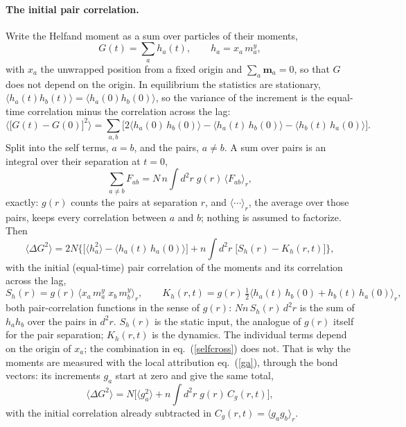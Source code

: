 \documentclass[11pt,aps,preprint,nofootinbib,superscriptaddress,tightenlines]{revtex4-2}
\def\st{\begin{equation}}
\def\stp{\end{equation}}
\def\Eq#1{eq.~(\ref{#1})}
\newcommand{\avg}[1]{\langle #1\rangle}
\let\oldparagraph\paragraph
\renewcommand{\paragraph}{\par\bigskip\oldparagraph}
\begin{document}
\paragraph{The initial pair correlation.}  Write the Helfand moment as a sum over particles of their moments,
\st
G(t)=\sum_ah_a(t),\qquad h_a=x_a\,m_a^y ,
\stp
with $x_a$ the unwrapped position from a fixed origin and $\sum_a\bm m_a=0$, so that $G$ does not depend on the origin.  In equilibrium the
statistics are stationary, $\avg{h_a(t)h_b(t)}=\avg{h_a(0)h_b(0)}$, so the variance of the increment is the equal-time correlation minus the
correlation across the lag:
\st
\avg{\big[G(t)-G(0)\big]^2}=\sum_{a,b}\Big[2\avg{h_a(0)\,h_b(0)}-\avg{h_a(t)\,h_b(0)}-\avg{h_b(t)\,h_a(0)}\Big] .
\stp
Split into the self terms, $a=b$, and the pairs, $a\neq b$.  A sum over pairs is an integral over their separation at $t=0$,
\st
\sum_{a\neq b}F_{ab}=N\,n\int d^2r\;g(r)\,\avg{F_{ab}}_r ,
\stp
exactly: $g(r)$ counts the pairs at separation $r$, and $\avg{\cdots}_r$, the average over those pairs, keeps every correlation between $a$ and $b$; nothing
is assumed to factorize.  Then
\st
\avg{\Delta G^2}=2N\Big\{\Big[\avg{h_a^2}-\avg{h_a(t)\,h_a(0)}\Big]
+n\int d^2r\;\Big[S_h(r)-K_h(r,t)\Big]\Big\} ,
\label{selfcross}
\stp
with the initial (equal-time) pair correlation of the moments and its correlation across the lag,
\st
S_h(r)=g(r)\,\avg{x_a\,m_a^y\;x_b\,m_b^y}_r ,\qquad
K_h(r,t)=g(r)\,\tfrac12\avg{h_a(t)\,h_b(0)+h_b(t)\,h_a(0)}_r ,
\stp
both pair-correlation functions in the sense of $g(r)$: $N n\,S_h(r)\,d^2r$ is the sum of $h_ah_b$ over the pairs in $d^2r$.  $S_h(r)$ is the static
input, the analogue of $g(r)$ itself for the pair separation; $K_h(r,t)$ is the dynamics.  The individual terms depend on the origin of $x_a$;
the combination in \Eq{selfcross} does not.  That is why the moments are measured with the local attribution \Eq{ga}, through the bond
vectors: its increments $g_a$ start at zero and give the same total,
\st
\avg{\Delta G^2}=N\Big[\avg{g_a^2}+n\int d^2r\;g(r)\,C_g(r,t)\Big],
\label{selfcrossg}
\stp
with the initial correlation already subtracted in $C_g(r,t)=\avg{g_ag_b}_r$.
\end{document}
